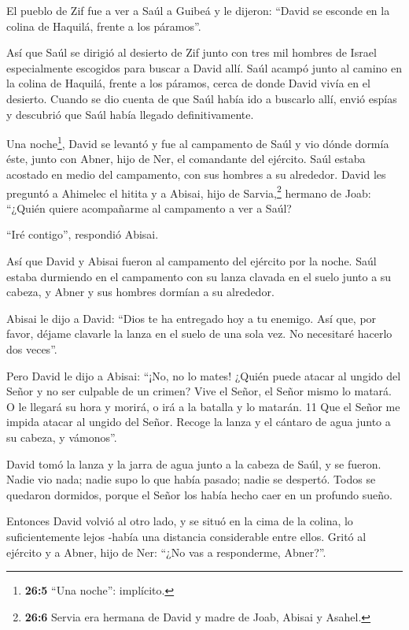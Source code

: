  El pueblo de Zif fue a ver a Saúl a Guibeá y le dijeron:
``David se esconde en la colina de Haquilá, frente a los páramos''.

 Así que Saúl se dirigió al desierto de Zif junto con tres
mil hombres de Israel especialmente escogidos para buscar a David allí.
 Saúl acampó junto al camino en la colina de Haquilá, frente
a los páramos, cerca de donde David vivía en el desierto. Cuando se dio
cuenta de que Saúl había ido a buscarlo allí,  envió espías
y descubrió que Saúl había llegado definitivamente.

 Una noche\footnote{\textbf{26:5} ``Una noche'': implícito.},
David se levantó y fue al campamento de Saúl y vio dónde dormía éste,
junto con Abner, hijo de Ner, el comandante del ejército. Saúl estaba
acostado en medio del campamento, con sus hombres a su alrededor.
 David les preguntó a Ahimelec el hitita y a Abisai, hijo de
Sarvia,\footnote{\textbf{26:6} Servia era hermana de David y madre de
  Joab, Abisai y Asahel.} hermano de Joab: ``¿Quién quiere acompañarme
al campamento a ver a Saúl?

``Iré contigo'', respondió Abisai.

 Así que David y Abisai fueron al campamento del ejército
por la noche. Saúl estaba durmiendo en el campamento con su lanza
clavada en el suelo junto a su cabeza, y Abner y sus hombres dormían a
su alrededor.

 Abisai le dijo a David: ``Dios te ha entregado hoy a tu
enemigo. Así que, por favor, déjame clavarle la lanza en el suelo de una
sola vez. No necesitaré hacerlo dos veces''.

 Pero David le dijo a Abisai: ``¡No, no lo mates! ¿Quién
puede atacar al ungido del Señor y no ser culpable de un crimen?
 Vive el Señor, el Señor mismo lo matará. O le llegará su
hora y morirá, o irá a la batalla y lo matarán. 11 Que el Señor me
impida atacar al ungido del Señor. Recoge la lanza y el cántaro de agua
junto a su cabeza, y vámonos''.

 David tomó la lanza y la jarra de agua junto a la cabeza
de Saúl, y se fueron. Nadie vio nada; nadie supo lo que había pasado;
nadie se despertó. Todos se quedaron dormidos, porque el Señor los había
hecho caer en un profundo sueño.

 Entonces David volvió al otro lado, y se situó en la cima
de la colina, lo suficientemente lejos -había una distancia considerable
entre ellos.  Gritó al ejército y a Abner, hijo de Ner:
``¿No vas a responderme, Abner?''.

